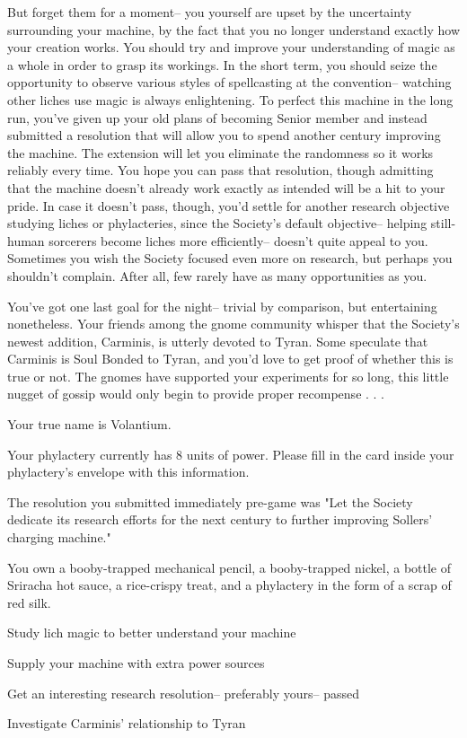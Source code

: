 \documentclass[char]{Sel}
\begin{document}
But forget them for a moment-- you yourself are upset by the uncertainty surrounding your machine, by the fact that you no longer understand exactly how your creation works. You should try and improve your understanding of magic as a whole in order to grasp its workings. In the short term, you should seize the opportunity to observe various styles of spellcasting at the convention-- watching other liches use magic is always enlightening. To perfect this machine in the long run, you've given up your old plans of becoming Senior member and instead submitted a resolution that will allow you to spend another century improving the machine. The extension will let you eliminate the randomness so it works reliably every time. You hope you can pass that resolution, though admitting that the machine doesn't already work exactly as intended will be a hit to your pride. In case it doesn't pass, though, you'd settle for another research objective studying liches or phylacteries, since the Society’s default objective-- helping still-human sorcerers become liches more efficiently-- doesn’t quite appeal to you. Sometimes you wish the Society focused even more on research, but perhaps you shouldn't complain. After all, few rarely have as many opportunities as you.

You've got one last goal for the night-- trivial by comparison, but entertaining nonetheless. Your friends among the gnome community whisper that the Society's newest addition, Carminis, is utterly devoted to Tyran. Some speculate that Carminis is Soul Bonded to Tyran, and you'd love to get proof of whether this is true or not. The gnomes have supported your experiments for so long, this little nugget of gossip would only begin to provide proper recompense . . .
\begin{itemz}[Notes]
  \item Your true name is Volantium.
      \item Your phylactery currently has 8 units of power. Please fill in the card inside your phylactery's envelope with this information.
  \item The resolution you submitted immediately pre-game was "Let the Society dedicate its research efforts for the next century to further improving Sollers' charging machine."
  \item You own a booby-trapped mechanical pencil, a booby-trapped nickel, a bottle of Sriracha hot sauce, a rice-crispy treat, and a phylactery in the form of a scrap of red silk.
    \end{itemz}


 \begin{itemz}[Goals]
 \item Study lich magic to better understand your machine
\item Supply your machine with extra power sources
\item Get an interesting research resolution-- preferably yours-- passed
\item Investigate Carminis' relationship to Tyran
\end{itemz}
\end{document}
